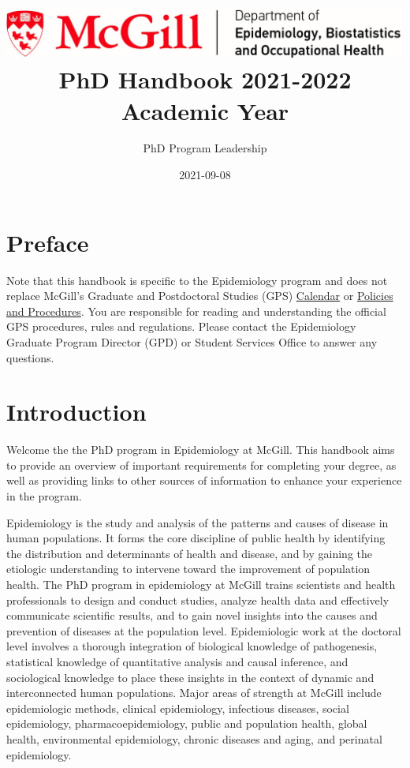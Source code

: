 \documentclass[
  openany]{book}
\title{\includegraphics[width=6.25in,height=\textheight]{mcgill-epi-logo.png} PhD Handbook 2021-2022 Academic Year}
\author{PhD Program Leadership}
\date{2021-09-08}
\begin{document}
\maketitle

{
\hypersetup{linkcolor=}
\setcounter{tocdepth}{1}
\tableofcontents
}
\hypertarget{preface}{%
\chapter*{Preface}\label{preface}}

Note that this handbook is specific to the Epidemiology program and does not replace McGill's Graduate and Postdoctoral Studies (GPS) \href{https://www.mcgill.ca/students/courses/calendars/}{Calendar} or \href{https://www.mcgill.ca/gps/students/policies-and-guidelines}{Policies and Procedures}. You are responsible for reading and understanding the official GPS procedures, rules and regulations. Please contact the Epidemiology Graduate Program Director (GPD) or Student Services Office to answer any questions.

\hypertarget{introduction}{%
\chapter{Introduction}\label{introduction}}

Welcome the the PhD program in Epidemiology at McGill. This handbook aims to provide an overview of important requirements for completing your degree, as well as providing links to other sources of information to enhance your experience in the program.

Epidemiology is the study and analysis of the patterns and causes of disease in human populations. It forms the core discipline of public health by identifying the distribution and determinants of health and disease, and by gaining the etiologic understanding to intervene toward the improvement of population health. The PhD program in epidemiology at McGill trains scientists and health professionals to design and conduct studies, analyze health data and effectively communicate scientific results, and to gain novel insights into the causes and prevention of diseases at the population level. Epidemiologic work at the doctoral level involves a thorough integration of biological knowledge of pathogenesis, statistical knowledge of quantitative analysis and causal inference, and sociological knowledge to place these insights in the context of dynamic and interconnected human populations. Major areas of strength at McGill include epidemiologic methods, clinical epidemiology, infectious diseases, social epidemiology, pharmacoepidemiology, public and population health, global health, environmental epidemiology, chronic diseases and aging, and perinatal epidemiology.
\end{document}
